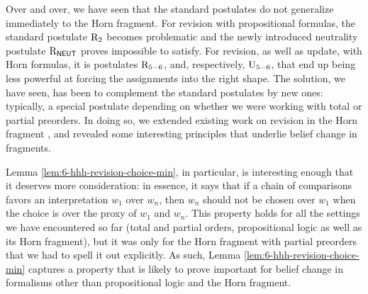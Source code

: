 Over and over, we have seen that the standard postulates 
do not generalize immediately to the Horn fragment.
For revision with propositional formulas, 
the standard postulate $\mathrm{R}_{2}$ becomes problematic and 
the newly introduced neutrality postulate $\mathrm{R}_{\mathsf{NEUT}}$
proves impossible to satisfy.
For revision, as well as update, with Horn formulas,
it is postulates $\mathrm{R}_{5-6}$, and, respectively, $\mathrm{U}_{5-6}$,
that end up being less powerful at forcing the assignments 
into the right shape.
The solution, we have seen, has been to complement the standard 
postulates by new ones: typically, a special postulate depending 
on whether we were working with total or partial preorders.
In doing so, we extended existing work on revision in the Horn fragment 
\cite{DelgrandeP15,DelgrandePW18},
and revealed some interesting principles that underlie belief change in fragments.

Lemma \ref{lem:6-hhh-revision-choice-min}, in particular, 
is interesting enough that it deserves more consideration:
in essence, it says that if a chain of comparisons 
favors an interpretation $w_1$ over $w_n$, then $w_n$ should not 
be chosen over $w_1$  when the choice 
is over the proxy of $w_1$ and $w_n$.
This property holds for all the settings we have encountered so far 
(total and partial orders, propositional logic as well as its Horn fragment),
but it was only for the Horn fragment with partial preorders that we had 
to spell it out explicitly.
As such, Lemma \ref{lem:6-hhh-revision-choice-min} captures a property that
is likely to prove important for belief change in formalisms other than
propositional logic and the Horn fragment.







